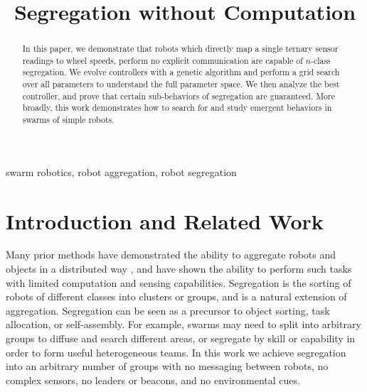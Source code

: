 \documentclass[conference]{IEEEtran}
\begin{document}
\title{Segregation without Computation}

\author{
}

\maketitle

\begin{abstract}
  In this paper, we demonstrate that robots which directly map a single ternary sensor readings to wheel speeds, perform no explicit communication are capable of $n$-class segregation. We evolve controllers with a genetic algorithm and perform a grid search over all parameters to understand the full parameter space. We then analyze the best controller, and prove that certain sub-behaviors of segregation are guaranteed. More broadly, this work demonstrates how to search for and study emergent behaviors in swarms of simple robots.
\end{abstract}

\begin{IEEEkeywords}
  swarm robotics, robot aggregation, robot segregation
\end{IEEEkeywords}

\section{Introduction and Related Work}

  Many prior methods have demonstrated the ability to aggregate robots and objects in a distributed way \cite{shlyakhov_survey_2017}, and \cite{gauci_self-organized_2014}\cite{gauci_clustering_2014} have shown the ability to perform such tasks with limited computation and sensing capabilities. Segregation is the sorting of robots of different classes into clusters or groups, and is a natural extension of aggregation. Segregation can be seen as a precursor to object sorting, task allocation, or self-assembly. For example, swarms may need to split into arbitrary groups to diffuse and search different areas, or segregate by skill or capability in order to form useful heterogeneous teams. In this work we achieve segregation into an arbitrary number of groups with no messaging between robots, no complex sensors, no leaders or beacons, and no environmental cues.
\end{document}
